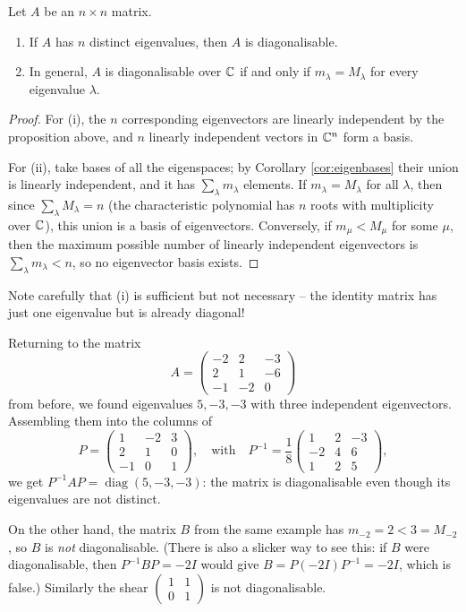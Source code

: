 \documentclass[a4paper]{scrartcl}
\newcommand{\diag}{\operatorname{diag}}
\begin{document}
\begin{theorem}
	Let $A$ be an $n \times n$ matrix.
	\begin{enumerate}[label=(\roman*)]
		\item If $A$ has $n$ distinct eigenvalues, then $A$ is diagonalisable.
		\item In general, $A$ is diagonalisable over $\mathbb{C}$ if and only if $m_\lambda = M_\lambda$ for every eigenvalue $\lambda$.
	\end{enumerate}
\end{theorem}
\begin{proof}
	For (i), the $n$ corresponding eigenvectors are linearly independent by the proposition above, and $n$ linearly independent vectors in $\mathbb{C}^n$ form a basis.

	For (ii), take bases of all the eigenspaces; by Corollary \ref{cor:eigenbases} their union is linearly independent, and it has $\sum_\lambda m_\lambda$ elements. If $m_\lambda = M_\lambda$ for all $\lambda$, then since $\sum_\lambda M_\lambda = n$ (the characteristic polynomial has $n$ roots with multiplicity over $\mathbb{C}$), this union is a basis of eigenvectors. Conversely, if $m_\mu < M_\mu$ for some $\mu$, then the maximum possible number of linearly independent eigenvectors is $\sum_\lambda m_\lambda < n$, so no eigenvector basis exists.
\end{proof}

Note carefully that (i) is sufficient but not necessary -- the identity matrix has just one eigenvalue but is already diagonal!

\begin{example}
	Returning to the matrix
	$$
	A = \begin{pmatrix}
		-2 & 2 & -3 \\ 2 & 1 & -6 \\ -1 & -2 & 0
	\end{pmatrix}
	$$
	from before, we found eigenvalues $5, -3, -3$ with three independent eigenvectors. Assembling them into the columns of
	$$
	P = \begin{pmatrix}
		1 & -2 & 3 \\
		2 & 1 & 0 \\
		-1 & 0 & 1
	\end{pmatrix}, \quad \text{with} \quad
	P^{-1} = \frac{1}{8}\begin{pmatrix}
		1 & 2 & -3 \\
		-2 & 4 & 6 \\
		1 & 2 & 5
	\end{pmatrix},
	$$
	we get $P^{-1}AP = \diag(5, -3, -3)$: the matrix is diagonalisable even though its eigenvalues are not distinct.

	On the other hand, the matrix $B$ from the same example has $m_{-2} = 2 < 3 = M_{-2}$, so $B$ is \emph{not} diagonalisable. (There is also a slicker way to see this: if $B$ were diagonalisable, then $P^{-1}BP = -2I$ would give $B = P(-2I)P^{-1} = -2I$, which is false.) Similarly the shear $\begin{pmatrix} 1 & 1 \\ 0 & 1 \end{pmatrix}$ is not diagonalisable.
\end{example}
\end{document}
